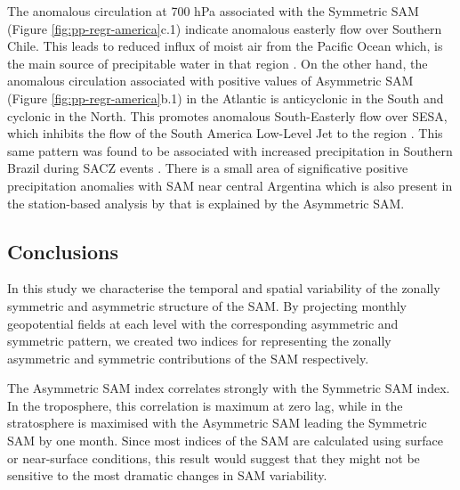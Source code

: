 \documentclass[smallextended]{svjour3}       %
\begin{document}
The anomalous circulation at 700 hPa associated with the Symmetric SAM (Figure \ref{fig:pp-regr-america}c.1) indicate anomalous easterly flow over Southern Chile. This leads to reduced influx of moist air from the Pacific Ocean which, is the main source of precipitable water in that region \citep[e.g.][]{garreaud2007}. On the other hand, the anomalous circulation associated with positive values of Asymmetric SAM (Figure \ref{fig:pp-regr-america}b.1) in the Atlantic is anticyclonic in the South and cyclonic in the North. This promotes anomalous South-Easterly flow over SESA, which inhibits the flow of the South America Low-Level Jet to the region \citep{silvestri2009, zamboni2010}. This same pattern was found to be associated with increased precipitation in Southern Brazil during SACZ events \citep{rosso2018}. There is a small area of significative positive precipitation anomalies with SAM near central Argentina which is also present in the station-based analysis by \citet{gillett2006} that is explained by the Asymmetric SAM.

\hypertarget{conclusions}{%
\subsection{Conclusions}\label{conclusions}}

In this study we characterise the temporal and spatial variability of the zonally symmetric and asymmetric structure of the SAM. By projecting monthly geopotential fields at each level with the corresponding asymmetric and symmetric pattern, we created two indices for representing the zonally asymmetric and symmetric contributions of the SAM respectively.

The Asymmetric SAM index correlates strongly with the Symmetric SAM index. In the troposphere, this correlation is maximum at zero lag, while in the stratosphere is maximised with the Asymmetric SAM leading the Symmetric SAM by one month. Since most indices of the SAM are calculated using surface or near-surface conditions, this result would suggest that they might not be sensitive to the most dramatic changes in SAM variability.
\end{document}

